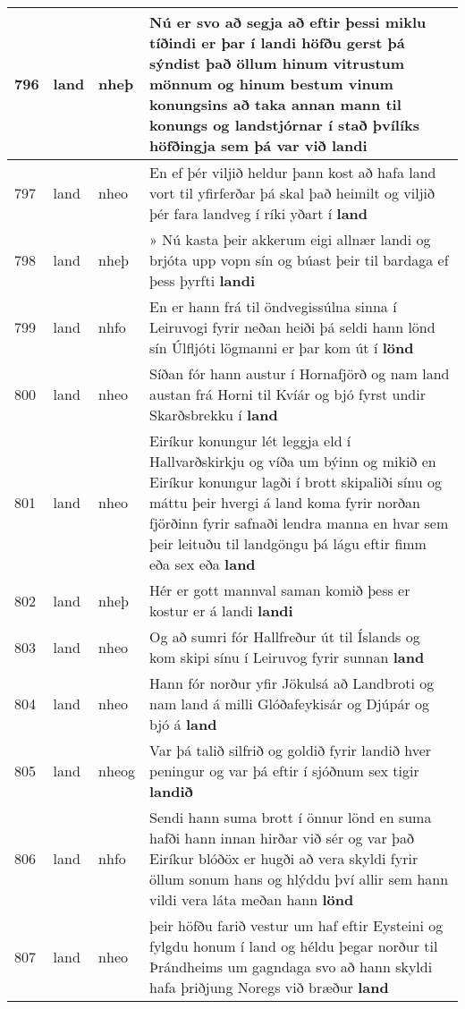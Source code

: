 \documentclass{article}
\begin{document}
\begin{longtable}{p{1cm}|p{1cm}|p{1cm}|p{13cm}}
\hline
796&land&nheþ&Nú er svo að segja að eftir þessi miklu tíðindi er þar í landi höfðu gerst þá sýndist það öllum hinum vitrustum mönnum og hinum bestum vinum konungsins að taka annan mann til konungs og landstjórnar í stað þvílíks höfðingja sem þá var við \textbf{landi} \\
\hline
797&land&nheo&En ef þér viljið heldur þann kost að hafa land vort til yfirferðar þá skal það heimilt og viljið þér fara landveg í ríki yðart í \textbf{land} \\
\hline
798&land&nheþ&» Nú kasta þeir akkerum eigi allnær landi og brjóta upp vopn sín og búast þeir til bardaga ef þess þyrfti \textbf{landi} \\
\hline
799&land&nhfo&En er hann frá til öndvegissúlna sinna í Leiruvogi fyrir neðan heiði þá seldi hann lönd sín Úlfljóti lögmanni er þar kom út í \textbf{lönd} \\
\hline
800&land&nheo&Síðan fór hann austur í Hornafjörð og nam land austan frá Horni til Kvíár og bjó fyrst undir Skarðsbrekku í \textbf{land} \\
\hline
801&land&nheo&Eiríkur konungur lét leggja eld í Hallvarðskirkju og víða um býinn og mikið en Eiríkur konungur lagði í brott skipaliði sínu og máttu þeir hvergi á land koma fyrir norðan fjörðinn fyrir safnaði lendra manna en hvar sem þeir leituðu til landgöngu þá lágu eftir fimm eða sex eða \textbf{land} \\
\hline
802&land&nheþ&Hér er gott mannval saman komið þess er kostur er á landi \textbf{landi} \\
\hline
803&land&nheo&Og að sumri fór Hallfreður út til Íslands og kom skipi sínu í Leiruvog fyrir sunnan \textbf{land} \\
\hline
804&land&nheo&Hann fór norður yfir Jökulsá að Landbroti og nam land á milli Glóðafeykisár og Djúpár og bjó á \textbf{land} \\
\hline
805&land&nheog&Var þá talið silfrið og goldið fyrir landið hver peningur og var þá eftir í sjóðnum sex tigir \textbf{landið} \\
\hline
806&land&nhfo&Sendi hann suma brott í önnur lönd en suma hafði hann innan hirðar við sér og var það Eiríkur blóðöx er hugði að vera skyldi fyrir öllum sonum hans og hlýddu því allir sem hann vildi vera láta meðan hann \textbf{lönd} \\
\hline
807&land&nheo&þeir höfðu farið vestur um haf eftir Eysteini og fylgdu honum í land og héldu þegar norður til Þrándheims um gagndaga svo að hann skyldi hafa þriðjung Noregs við bræður \textbf{land} \\

\end{longtable}
\end{document}
